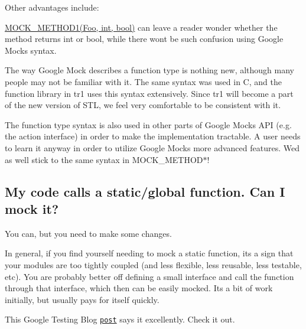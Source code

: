 Other advantages include\+:
\begin{DoxyEnumerate}
\item {\ttfamily \hyperlink{gmock-generated-function-mockers_8h_ac49d366be035ee87b73264a29059cdc7}{M\+O\+C\+K\+\_\+\+M\+E\+T\+H\+O\+D1(\+Foo, int, bool)}} can leave a reader wonder whether the method returns {\ttfamily int} or {\ttfamily bool}, while there won\textquotesingle{}t be such confusion using Google Mock\textquotesingle{}s syntax.
\end{DoxyEnumerate}
\begin{DoxyEnumerate}
\item The way Google Mock describes a function type is nothing new, although many people may not be familiar with it. The same syntax was used in C, and the {\ttfamily function} library in {\ttfamily tr1} uses this syntax extensively. Since {\ttfamily tr1} will become a part of the new version of S\+TL, we feel very comfortable to be consistent with it.
\end{DoxyEnumerate}
\begin{DoxyEnumerate}
\item The function type syntax is also used in other parts of Google Mock\textquotesingle{}s A\+PI (e.\+g. the action interface) in order to make the implementation tractable. A user needs to learn it anyway in order to utilize Google Mock\textquotesingle{}s more advanced features. We\textquotesingle{}d as well stick to the same syntax in {\ttfamily M\+O\+C\+K\+\_\+\+M\+E\+T\+H\+O\+D$\ast$}!
\end{DoxyEnumerate}

\subsection*{My code calls a static/global function. Can I mock it?}

You can, but you need to make some changes.

In general, if you find yourself needing to mock a static function, it\textquotesingle{}s a sign that your modules are too tightly coupled (and less flexible, less reusable, less testable, etc). You are probably better off defining a small interface and call the function through that interface, which then can be easily mocked. It\textquotesingle{}s a bit of work initially, but usually pays for itself quickly.

This Google Testing Blog \href{http://googletesting.blogspot.com/2008/06/defeat-static-cling.html}{\tt post} says it excellently. Check it out.

